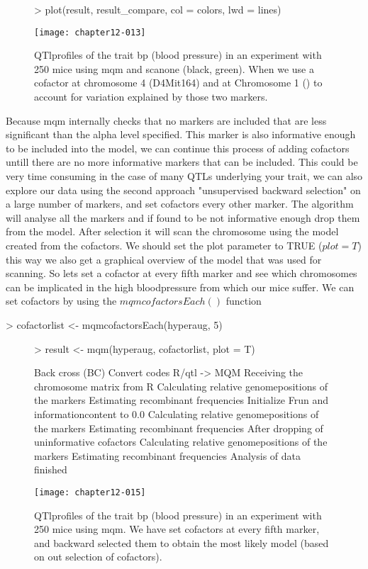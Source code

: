 \documentclass[11pt]{article}
\begin{document}
\begin{figure}[ht]
\begin{Schunk}
\begin{Sinput}
> plot(result, result_compare, col = colors, lwd = lines)
\end{Sinput}
\end{Schunk}
\texttt{[image: chapter12-013]}
\caption{QTlprofiles of the trait bp (blood pressure) in an experiment with 250 mice using mqm and scanone (black, green). When we use a cofactor at chromosome 4 (D4Mit164) and at Chromosome 1 () to account for variation explained by those two markers.}
\end{figure}
\clearpage
Because mqm internally checks that no markers are included that are less significant than the alpha level specified. This marker is also informative enough to be included into the model, we can continue this process of adding
cofactors untill there are no more informative markers that can be included. This could be very time consuming in the case of many QTLs underlying your trait, we can also explore our data using the second approach "unsupervised backward selection" on a large number of markers, and set cofactors every other marker. The algorithm will analyse all the markers and if found to be not informative enough drop them from the model. After selection it will scan the chromosome using the model created from the cofactors. We should set the plot parameter to TRUE ($plot=T$) this way we also get a graphical overview of the model that was used for scanning. So lets set a cofactor at every fifth marker and see which chromosomes can be implicated in the high bloodpressure from which our mice suffer. We can set cofactors by using the $mqmcofactorsEach()$ function\\
\begin{Schunk}
\begin{Sinput}
> cofactorlist <- mqmcofactorsEach(hyperaug, 5)
\end{Sinput}
\end{Schunk}
\begin{figure}[ht]
\begin{Schunk}
\begin{Sinput}
> result <- mqm(hyperaug, cofactorlist, plot = T)
\end{Sinput}
\begin{Soutput}
Back cross (BC)
Convert codes R/qtl -> MQM
Receiving the chromosome matrix from R
Calculating relative genomepositions of the markers
Estimating recombinant frequencies
Initialize Frun and informationcontent to 0.0
Calculating relative genomepositions of the markers
Estimating recombinant frequencies
After dropping of uninformative cofactors
Calculating relative genomepositions of the markers
Estimating recombinant frequencies
Analysis of data finished
\end{Soutput}
\end{Schunk}
\texttt{[image: chapter12-015]}
\caption{QTlprofiles of the trait bp (blood pressure) in an experiment with 250 mice using mqm. We have set cofactors at every fifth marker, and backward selected them to obtain the most likely model (based on out selection of cofactors).
}
\end{figure}
\end{document}
